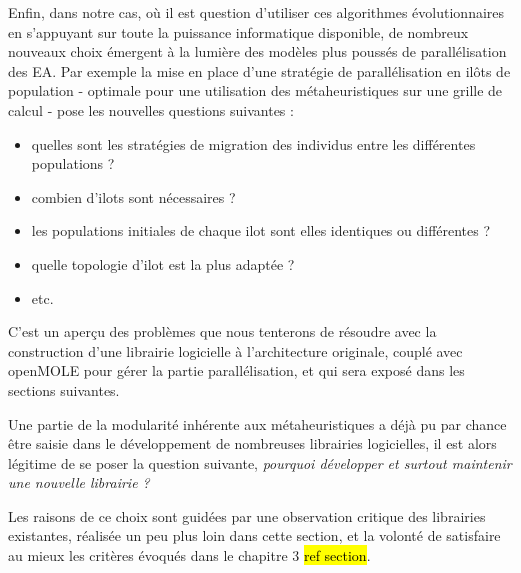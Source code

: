 Enfin, dans notre cas, où il est question d'utiliser ces algorithmes évolutionnaires en s'appuyant sur toute la puissance informatique disponible, de nombreux nouveaux choix \autocite[221-224]{DeJong2006a} émergent à la lumière des modèles plus poussés de parallélisation des EA. Par exemple la mise en place d'une stratégie de parallélisation en ilôts de population - optimale pour une utilisation des métaheuristiques sur une grille de calcul - pose les nouvelles questions suivantes :

\begin{itemize}
	\item quelles sont les stratégies de migration des individus entre les différentes populations ?
	\item combien d'ilots sont nécessaires ?
	\item les populations initiales de chaque ilot sont elles identiques ou différentes ?
	\item quelle topologie d'ilot est la plus adaptée ?
	\item etc.
\end{itemize}

C'est un aperçu des problèmes que nous tenterons de résoudre avec la construction d'une librairie logicielle à l'architecture originale, couplé avec openMOLE pour gérer la partie parallélisation, et qui sera exposé dans les sections suivantes.

Une partie de la modularité inhérente aux métaheuristiques a déjà pu par chance être saisie dans le développement de nombreuses librairies logicielles, il est alors légitime de se poser la question suivante, \textit{pourquoi développer et surtout maintenir une nouvelle librairie ? }

Les raisons de ce choix sont guidées par une observation critique des librairies existantes, réalisée un peu plus loin dans cette section, et la volonté de satisfaire au mieux les critères évoqués dans le chapitre 3 \hl{ref section}.





